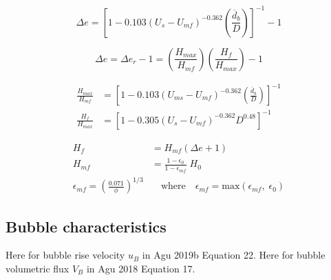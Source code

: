\documentclass[12pt,titlepage]{article}
\begin{document}
\begin{equation} \label{eq:delta-e-bub}
    \Delta e = \left[ 1 - 0.103 (U_s - U_{mf})^{-0.362} \left( \frac{\overline{d}_b}{D} \right) \right]^{-1} - 1
\end{equation}

\begin{equation} \label{eq:delta-er}
    \Delta e = \Delta e_r - 1 = \left(\frac{H_{max}}{H_{mf}}\right) \left(\frac{H_f}{H_{max}}\right) - 1
\end{equation}

\begin{align}
    \frac{H_{max}}{H_{mf}} &= \left[1 - 0.103 (U_{ms} - U_{mf})^{-0.362} \left( \frac{\overline{d}_b}{D} \right) \right]^{-1} \label{eq:h-ratio-1} \\
    \frac{H_{f}}{H_{max}} &= \left[1 - 0.305 (U_s - U_{mf})^{-0.362} D^{0.48} \right]^{-1} \label{eq:h-ratio-2}
\end{align}

\begin{align}
    H_f &= H_{mf} (\Delta e + 1) \label{eq:Hf} \\
    H_{mf} &= \frac{1 - \epsilon_0}{1 - \epsilon_{mf}} \; H_0 \label{eq:Hmf} \\
    \epsilon_{mf} = \left(\frac{0.071}{\phi}\right)^{1/3} &\quad \text{where} \quad \epsilon_{mf} = \text{max}(\epsilon_{mf},\; \epsilon_0) \label{eq:emf}
\end{align}

\subsection{Bubble characteristics}

Here for bubble rise velocity $u_B$ in Agu 2019b Equation 22. Here for bubble volumetric flux $V_B$ in Agu 2018 Equation 17.


\printnomenclature


\printbibliography
\end{document}
